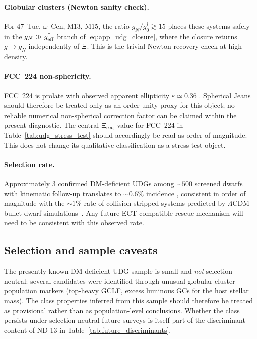 \paragraph{Globular clusters (Newton sanity check).}
For 47~Tuc, $\omega$~Cen, M13, M15, the ratio
$g_N/g^\dagger_0\gtrsim 15$ places these systems safely in the
$g_N\gg g^\dagger_{\rm eff}$ branch of
\eqref{eq:app_udg_closure}, where the closure returns
$g\to g_N$ independently of $\Xi$.  This is the trivial Newton
recovery check at high density.

\paragraph{FCC~224 non-sphericity.}
FCC~224 is prolate with observed apparent ellipticity
$\varepsilon\simeq 0.36$ \cite{Buzzo2025FCC224}.  Spherical
Jeans should therefore be treated only as an order-unity proxy
for this object; no reliable numerical non-spherical correction
factor can be claimed within the present diagnostic.  The central
$\Xi_{\rm req}$ value for FCC~224 in
Table~\ref{tab:udg_stress_test} should accordingly be read as
order-of-magnitude.  This does not change its qualitative
classification as a stress-test object.

\paragraph{Selection rate.}
Approximately 3 confirmed DM-deficient UDGs among $\sim 500$
screened dwarfs with kinematic follow-up translates to
$\sim 0.6\%$ incidence \cite{Moreno2022DMfree}, consistent in
order of magnitude with the $\sim 1\%$ rate of collision-stripped
systems predicted by $\Lambda$CDM bullet-dwarf
simulations~\cite{Ogiya2018DF2tidal,vanDokkum2022bullet}.  Any
future ECT-compatible rescue mechanism will need to be consistent
with this observed rate.

\subsection{Selection and sample caveats}
\label{app:udg:sample}

The presently known DM-deficient UDG sample is small and
\emph{not} selection-neutral: several candidates were identified
through unusual globular-cluster-population markers
(top-heavy GCLF, excess luminous GCs for the host stellar mass).
The class properties inferred from this sample should therefore be
treated as provisional rather than as population-level conclusions.
Whether the class persists under selection-neutral future
surveys is itself part of the discriminant content of ND-13 in
Table~\ref{tab:future_discriminants}.

